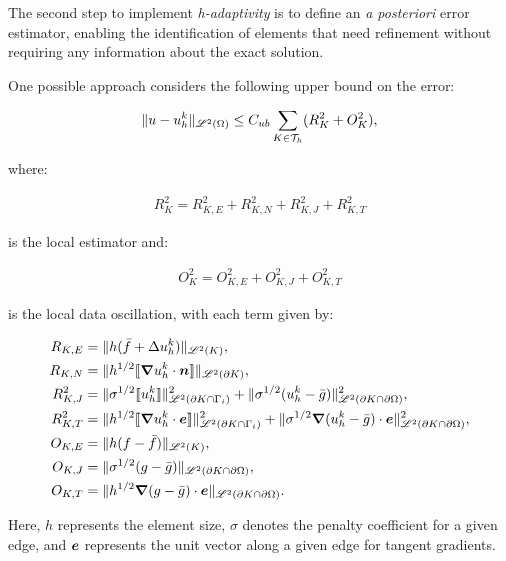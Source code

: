 The second step to implement \textit{h-adaptivity} is to define an \textit{a posteriori} error estimator, enabling the identification of elements that need refinement without requiring any information about the exact solution.

\cite{Cangiani2023} One possible approach considers the following upper bound on the error:

\begin{gather}
	\lVert u - u^k_h \rVert_{\mathscr{L}^2(\Omega)} \leq C_{ub} \sum_{K \in \mathcal{T}_h} (R_K^2 + O_K^2),
\end{gather}

where:

\begin{gather}
	R_K^2 = R_{K, E}^2 + R_{K, N}^2 + R_{K, J}^2 + R_{K, T}^2
\end{gather}

is the local estimator and:

\begin{gather}
	O_K^2 = O_{K, E}^2 + O_{K, J}^2 + O_{K, T}^2
\end{gather}

is the local data oscillation, with each term given by:

\begin{align}
	R_{K, E} &= \lVert h (\bar{f} + \Delta u^k_h) \rVert_{\mathscr{L}^2(K)}, \\
	R_{K, N} &= \lVert h^{1/2} \llbracket \bm{\nabla} u^k_h \cdot \bm{n} \rrbracket \rVert_{\mathscr{L}^2(\partial K)}, \\
	R^2_{K, J} &= \lVert \sigma^{1/2} \llbracket u^k_h \rrbracket \rVert^2_{\mathscr{L}^2(\partial K \cap \Gamma_{i})} + \lVert \sigma^{1/2} (u^k_h - \bar{g}) \rVert^2_{\mathscr{L}^2(\partial K \cap \partial \Omega)}, \\
	R^2_{K, T} &= \lVert h^{1/2} \llbracket \bm{\nabla} u^k_h \cdot \bm{e} \rrbracket \rVert^2_{\mathscr{L}^2(\partial K \cap \Gamma_{i})} + \lVert \sigma^{1/2} \bm{\nabla} (u^k_h - \bar{g}) \cdot \bm{e} \rVert^2_{\mathscr{L}^2(\partial K \cap \partial \Omega)}, \\
	O_{K, E} &= \lVert h (f - \bar{f}) \rVert_{\mathscr{L}^2(K)}, \\
	O_{K, J} &= \lVert \sigma^{1/2} (g - \bar{g}) \rVert_{\mathscr{L}^2(\partial K \cap \partial \Omega)}, \\
	O_{K, T} &= \lVert h^{1/2} \bm{\nabla} (g - \bar{g}) \cdot \bm{e} \rVert_{\mathscr{L}^2(\partial K \cap \partial \Omega)}.
\end{align}

Here, $h$ represents the element size, $\sigma$ denotes the penalty coefficient for a given edge, and $\bm{e}$ represents the unit vector along a given edge for tangent gradients.

